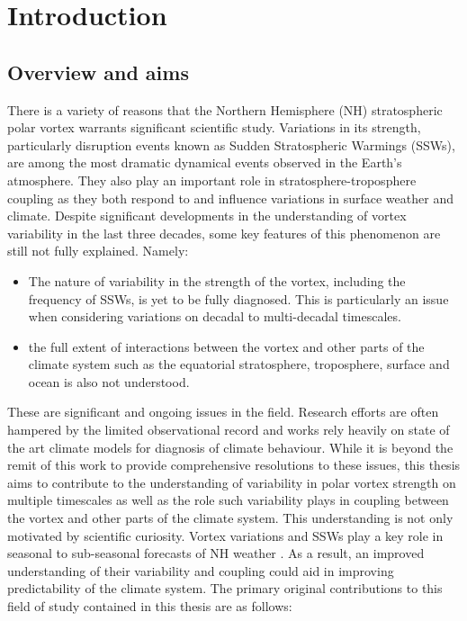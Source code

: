 \chapter{Introduction}
\label{cha:intro}

\section{Overview and aims}
\label{sec:overview}

There is a variety of reasons that the Northern Hemisphere (NH) stratospheric polar vortex warrants significant scientific study. Variations in its strength, particularly disruption events known as Sudden Stratospheric Warmings (SSWs), are among the most dramatic dynamical events observed in the Earth's atmosphere. They also play an important role in stratosphere-troposphere coupling as they both respond to and influence variations in surface weather and climate. Despite significant developments in the understanding of vortex variability in the last three decades, some key features of this phenomenon are still not fully explained. Namely: 

\begin{itemize}
    \item The nature of variability in the strength of the vortex, including the frequency of SSWs, is yet to be fully diagnosed. This is particularly an issue when considering variations on decadal to multi-decadal timescales.  
    
    \item the full extent of interactions between the vortex and other parts of the climate system such as the equatorial stratosphere, troposphere, surface and ocean is also not understood. 
\end{itemize}

These are significant and ongoing issues in the field. Research efforts are often hampered by the limited observational record and works rely heavily on state of the art climate models for diagnosis of climate behaviour. While it is beyond the remit of this work to provide comprehensive resolutions to these issues, this thesis aims to contribute to the understanding of variability in polar vortex strength on multiple timescales as well as the role such variability plays in coupling between the vortex and other parts of the climate system. This understanding is not only motivated by scientific curiosity. Vortex variations and SSWs play a key role in seasonal to sub-seasonal forecasts of NH weather \citep{scaifeSeasonal2016}. As a result, an improved understanding of their variability and coupling could aid in improving predictability of the climate system. The primary original contributions to this field of study contained in this thesis are as follows:

